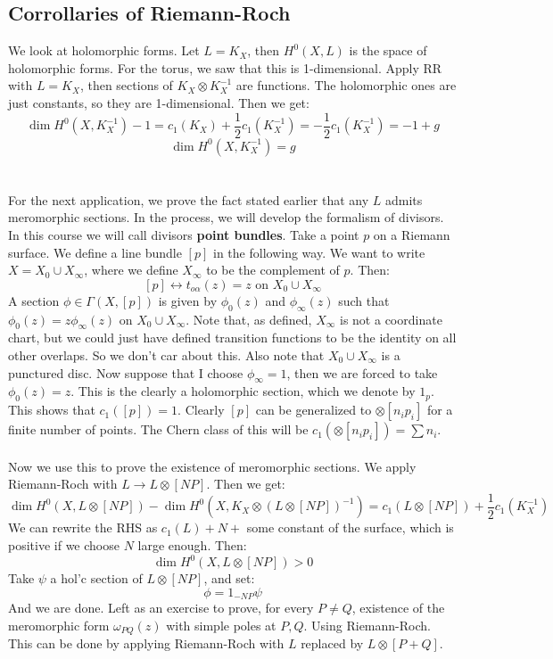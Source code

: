 \documentclass[12 pt]{article}
\theoremstyle{plain}
\theoremstyle{definition}
\theoremstyle{remark}
\begin{document}
\subsection*{Corrollaries of Riemann-Roch}
We look at holomorphic forms. Let $L = K_X$, then $H^0(X,L)$ is the space of holomorphic forms. For the torus, we saw that this is 1-dimensional. Apply RR with $L = K_X$, then sections of $K_X \otimes K_X^{-1}$ are functions. The holomorphic ones are just constants, so they are 1-dimensional. Then we get:
\[         \dim H^0(X,K_X^{-1}) - 1 = c_1(K_X) + \frac{1}{2} c_1(K_X^{-1})   = - \frac{1}{2} c_1(K_X^{-1}) = -1 + g  \]
\[      \dim H^0(X,K_X^{-1}) = g        \]
\\
\\
For the next application, we prove the fact stated earlier that any $L$ admits meromorphic sections. In the process, we will develop the formalism of divisors. In this course we will call divisors \textbf{point bundles}. Take a point $p$ on a Riemann surface. We define a line bundle $[p]$ in the following way. We want to write $X = X_0 \cup X_{\infty}$, where we define $X_{\infty}$ to be the complement of $p$. Then:
\[      [p] \longleftrightarrow t_{o\alpha} (z) = z \text{ on } X_0 \cup X_{\infty}      \]
A section $\phi \in \Gamma(X, [p])$ is given by $\phi_0(z)$ and $\phi_{\infty}(z)$ such that $\phi_0(z) = z \phi_{\infty}(z) $ on $X_0 \cup X_{\infty}$. Note that, as defined, $X_{\infty}$ is not a coordinate chart, but we could just have defined transition functions to be the identity on all other overlaps. So we don't car about this. Also note that $X_0 \cup X_{\infty}$ is a punctured disc. Now suppose that I choose $\phi_{\infty} = 1$, then we are forced to take $\phi_0 (z) = z$. This is the clearly a holomorphic section, which we denote by $1_p$. This shows that $c_1([p]) = 1$. Clearly $[p]$ can be generalized to $\otimes[n_i p_i]$ for a finite number of points. The Chern class of this will be $c_1(\otimes[n_i p_i]) = \sum n_i$.
\\
\\
Now we use this to prove the existence of meromorphic sections. We apply Riemann-Roch with $L \to L \otimes [NP]$. Then we get:
\[       \dim H^0 (X,    L \otimes [NP]) - \dim H^0 (X, K_X \otimes ( L \otimes [NP] )^{-1}) = c_1 ( L \otimes [NP]) + \frac{1}{2} c_1(K_X^{-1})    \]
We can rewrite the RHS as $c_1(L) + N +$ some constant of the surface, which is positive if we choose $N$ large enough. Then:
\[     \dim H^0 (X,  L \otimes [NP]) > 0    \]
Take $\psi$ a hol'c section of $L \otimes [NP]$, and set:
\[       \phi = 1_{-NP}  \psi     \]
And we are done. Left as an exercise to prove, for every $P \neq Q$, existence of the meromorphic form $\omega_{PQ}(z)$ with simple poles at $P, Q$. Using Riemann-Roch. This can be done by applying Riemann-Roch with $L$ replaced by $L \otimes [P+Q]$.
\end{document}
